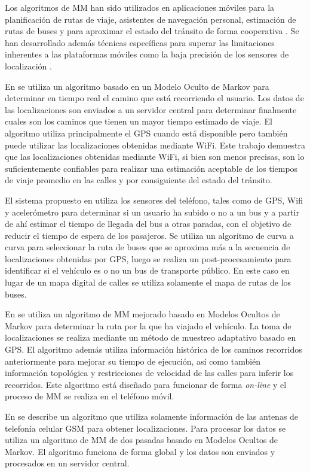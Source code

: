 Los algoritmos de MM han sido utilizados en aplicaciones móviles para la planificación de rutas de viaje, asistentes de navegación personal, estimación de rutas de buses y para aproximar el estado del tránsito de forma cooperativa \cite{thiagarajan2010cooperative, thiagarajan2009vtrack}. Se han desarrollado además técnicas específicas para superar las limitaciones inherentes a las plataformas móviles como la baja precisión de los sensores de localización  \cite{thiagarajan2011accurate, fang2011enacq}.

En \cite{thiagarajan2009vtrack} se utiliza un algoritmo basado en un Modelo Oculto de Markov para determinar en tiempo real el camino que está recorriendo el usuario. Los datos de las localizaciones son enviados a un servidor central para determinar finalmente cuales son los caminos que tienen un mayor tiempo estimado de viaje. El algoritmo utiliza principalmente el GPS cuando está disponible pero también puede utilizar las localizaciones obtenidas mediante WiFi. Este trabajo demuestra que las localizaciones obtenidas mediante WiFi, si bien son menos precisas, son lo suficientemente confiables para realizar una estimación aceptable de los tiempos de viaje promedio en las calles y por consiguiente del estado del tránsito.

El sistema propuesto en \cite{thiagarajan2010cooperative} utiliza los sensores del teléfono, tales como de GPS, Wifi y acelerómetro para determinar si un usuario ha subido o no a un bus y a partir de ahí estimar el tiempo de llegada del bus a otras paradas, con el objetivo de reducir el tiempo de espera de los pasajeros. Se utiliza un algoritmo de curva a curva para seleccionar la ruta de buses que se aproxima más a la secuencia de localizaciones obtenidas por GPS, luego se realiza un post-procesamiento para identificar si el vehículo es o no un bus de transporte público. En este caso en lugar de un mapa digital de calles se utiliza solamente el mapa de rutas de los buses.

En \cite{fang2011enacq} se utiliza un algoritmo de MM mejorado basado en Modelos Ocultos de Markov para determinar la ruta por la que ha viajado el vehículo. La toma de localizaciones se realiza mediante un método de muestreo adaptativo basado en GPS. El algoritmo además utiliza información histórica de los caminos recorridos anteriormente  para mejorar su tiempo de ejecución, así como también información topológica y restricciones de velocidad de las calles para inferir los recorridos. Este algoritmo está diseñado para funcionar de forma \emph{on-line} y el proceso de MM se realiza en el teléfono móvil.

En \cite{thiagarajan2011accurate} se describe un algoritmo que utiliza solamente información de las antenas de telefonía celular GSM para obtener localizaciones. Para procesar los datos se utiliza un algoritmo de MM de dos pasadas basado en Modelos Ocultos de Markov. El algoritmo funciona de forma global y los datos son enviados y procesados en un servidor central.

